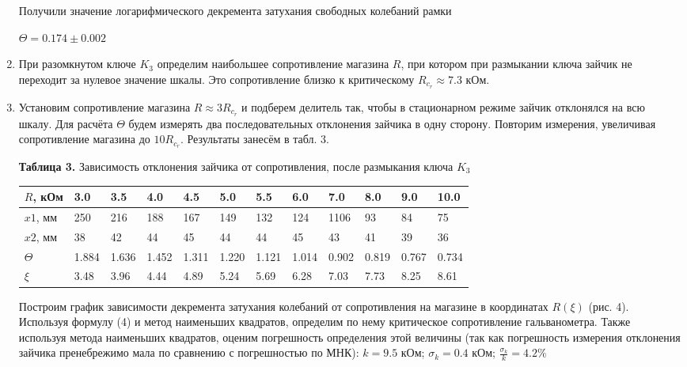 \documentclass[a4paper]{article}
\begin{document}
\begin{enumerate}
Получили значение логарифмического декремента затухания свободных колебаний рамки
\begin{center}
   $\Theta = 0.174 \pm 0.002$ 
\end{center}

\item При разомкнутом ключе $K_3$ определим наибольшее сопротивление магазина $R$, при котором при размыкании ключа зайчик не переходит за нулевое значение шкалы. Это сопротивление близко к критическому $R_c_r \approx 7.3$ кОм.

\item Установим сопротивление магазина $R \approx 3R_c_r$ и подберем делитель так, чтобы в стационарном режиме зайчик отклонялся на всю шкалу. Для расчёта $\Theta$ будем измерять два последовательных отклонения зайчика в одну сторону. Повторим измерения, увеличивая сопротивление магазина до $10R_c_r$. Результаты занесём в табл. 3.

\newpage

\begin{table}[h]
    \centering
    \begin{center}
        \textbf{Таблица 3.} Зависимость отклонения зайчика от сопротивления, после размыкания ключа $K_3$
    \end{center}
    \label{tab:my_label}
    \begin{tabular}{|p{1.5cm}||p{0.8cm}|p{0.8cm}|p{0.8cm}|p{0.8cm}|p{0.8cm}|p{0.8cm}|p{0.8cm}|p{0.8cm}|p{0.8cm}|p{0.8cm}|p{0.8cm}| }
        \hline
            $R$, кОм & 3.0 & 3.5 & 4.0 & 4.5 & 5.0 & 5.5 & 6.0 & 7.0 & 8.0 & 9.0 & 10.0 \\
        \hline
            $x1$, мм & 250 & 216 & 188 & 167 & 149 & 132 & 124 & 1106 & 93 & 84 & 75 \\
        \hline
            $x2$, мм & 38 & 42 & 44 & 45 & 44 & 44 & 45 & 43 & 41 & 39 & 36 \\
        \hline
            $\Theta$ & 1.884 & 1.636 & 1.452 & 1.311 & 1.220 & 1.121 & 1.014 & 0.902 & 0.819 & 0.767 & 0.734 \\
        \hline
            $\xi$ & 3.48 & 3.96 & 4.44 & 4.89 & 5.24 & 5.69 & 6.28 & 7.03 & 7.73 & 8.25 & 8.61 \\
        \hline
    \end{tabular}
\end{table}   

Построим график зависимости декремента затухания колебаний от сопротивления на магазине в координатах $R(\xi)$ (рис. 4). Используя формулу (4) и метод наименьших квадратов, определим по нему критическое сопротивление гальванометра. Также используя метода наименьших квадратов, оценим погрешность определения этой величины (так как погрешность измерения отклонения зайчика пренебрежимо мала по сравнению с погрешностью по МНК): \(k = 9.5\) кОм; \(\sigma_{k} = 0.4\) кОм; \(\frac{\sigma_{k}}{k} = 4.2 \%\)


\end{enumerate}
\end{document}
